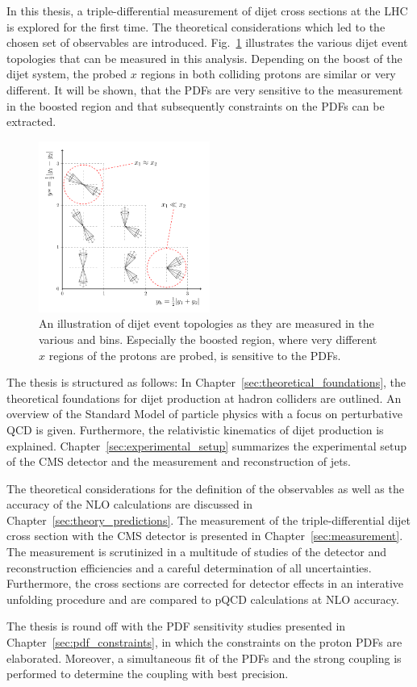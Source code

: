 In this thesis, a triple-differential measurement of dijet cross sections at the
LHC is explored for the first time. The theoretical considerations which led to
the chosen set of observables are introduced. Fig.~\ref{fig:intro_ybys_hint}
illustrates the various dijet event topologies that can be measured in this
analysis. Depending on the boost of the dijet system, the probed $x$ regions in
both colliding protons are similar or very different. It will be shown, that
the PDFs are very sensitive to the measurement in the boosted region and that
subsequently constraints on the PDFs can be extracted.
\\
\begin{figure}
    \centering
    \caption[Illustration of dijet topologies various \ystar and \yboost bins.]{
             An illustration of dijet event topologies as they are measured in
             the various \ystar and \yboost bins. Especially the boosted region,
             where very different $x$ regions of the protons are probed, is
             sensitive to the PDFs.}
    \label{fig:intro_ybys_hint}
    \includegraphics[width=0.5\textwidth]{figures/drawings/ybys_hint.pdf}
\end{figure}

The thesis is structured as follows: In
Chapter~\ref{sec:theoretical_foundations}, the theoretical foundations for dijet
production at hadron colliders are outlined. An overview of the Standard Model
of particle physics with a focus on perturbative QCD is given.  Furthermore, the
relativistic kinematics of dijet production is explained.
Chapter~\ref{sec:experimental_setup} summarizes the experimental setup of the
CMS detector and the measurement and reconstruction of jets. 

The theoretical considerations for the definition of the observables as well as
the accuracy of the NLO calculations are discussed in
Chapter~\ref{sec:theory_predictions}. The measurement of the triple-differential
dijet cross section with the CMS detector is presented in
Chapter~\ref{sec:measurement}. The measurement is scrutinized in a multitude of
studies of the detector and reconstruction efficiencies and a careful
determination of all uncertainties. Furthermore, the cross sections are
corrected for detector effects in an interative unfolding procedure and are
compared to pQCD calculations at NLO accuracy.

The thesis is round off with the PDF sensitivity studies presented in
Chapter~\ref{sec:pdf_constraints}, in which the constraints on the proton PDFs
are elaborated. Moreover, a simultaneous fit of the PDFs and the strong coupling
is performed to determine the coupling with best precision.

